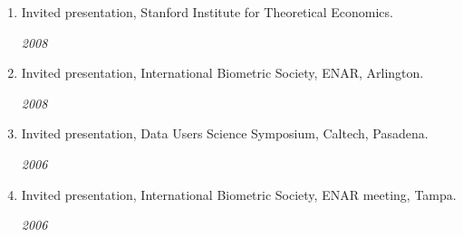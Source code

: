\documentclass[11pt]{article}
\newcommand{\head}[1]{
  \vspace{10pt}
  {\Large \bf #1} \\*[-0.8pc]
  \underline{\hspace{6.07in}}}
\newcommand{\datedentry}[2]{
  \vspace{5pt}
  \begin{minipage}{5in}{\textbf{#1}}\end{minipage}
  \hfill
  \begin{minipage}{1in}{\hfill\textit{#2}}\end{minipage}
  }
\newcommand{\ddatedentry}[2]{
  {#1}
  \hfill
  \begin{minipage}{.5in}{\hfill\textit{#2}}\end{minipage}
  }
\begin{document}
\begin{enumerate}
\item
\ddatedentry{Invited presentation, Stanford Institute for Theoretical Economics.}{2008}


\item
\ddatedentry{Invited  presentation, International Biometric Society, ENAR, Arlington.}{2008}

\item
\ddatedentry{Invited presentation, Data Users Science Symposium, Caltech, Pasadena.}{2006}

\item
\ddatedentry{Invited presentation, International Biometric Society, ENAR meeting, Tampa.}{2006}


\end{enumerate}


%
\end{document}
